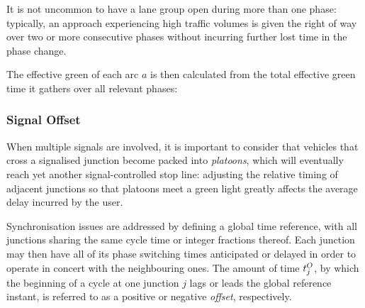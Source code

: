 
It is not uncommon to have a lane group open during more than one phase: typically, an
approach experiencing high traffic volumes is given the right of way over two or more
consecutive phases without incurring further lost time in the phase change.

The effective green of each arc $a$ is then calculated from the total effective green time it
gathers over all relevant phases:

\subsubsection{Signal Offset}
When multiple signals are involved, it is important to consider that vehicles that cross a signalised junction become packed into \emph{platoons}, which will eventually reach yet another signal-controlled stop line: adjusting the relative timing of adjacent junctions so that platoons meet a green light greatly affects the average delay incurred by the user. 

Synchronisation issues are addressed by defining a global time reference, with all junctions sharing the same cycle time or integer fractions thereof.
Each junction may then have all of its phase switching times anticipated or delayed in order to operate in concert with the neighbouring ones.
The amount of time $t_{j}^O$, by which the beginning of a cycle at one junction $j$ lags or leads the global reference instant, is referred to as a positive or negative \emph{offset}, respectively.

